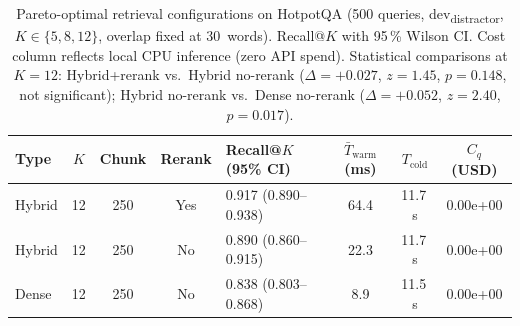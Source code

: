 \begin{table}[ht]
\centering
\small
\caption{Pareto-optimal retrieval configurations on HotpotQA (500 queries, dev\textsubscript{distractor}, $K\in\{5,8,12\}$, overlap fixed at 30~words). Recall@$K$ with 95\,\% Wilson CI. Cost column reflects local CPU inference (zero API spend). Statistical comparisons at $K=12$: Hybrid+rerank vs.\ Hybrid no-rerank ($\Delta = +0.027$, $z = 1.45$, $p = 0.148$, not significant); Hybrid no-rerank vs.\ Dense no-rerank ($\Delta = +0.052$, $z = 2.40$, $p = 0.017$).}
\label{tab:pareto}
\begin{tabular}{lccclccc}
\toprule
Type & $K$ & Chunk & Rerank & Recall@$K$ (95\% CI) & $\bar{T}_\mathrm{warm}$ (ms) & $T_\mathrm{cold}$ & $C_q$ (USD) \\
\midrule
Hybrid & 12 & 250 & Yes & 0.917 (0.890--0.938) & 64.4 & 11.7\,s & 0.00e+00 \\
Hybrid & 12 & 250 & No & 0.890 (0.860--0.915) & 22.3 & 11.7\,s & 0.00e+00 \\
Dense & 12 & 250 & No & 0.838 (0.803--0.868) & 8.9 & 11.5\,s & 0.00e+00 \\
\bottomrule
\end{tabular}
\end{table}
